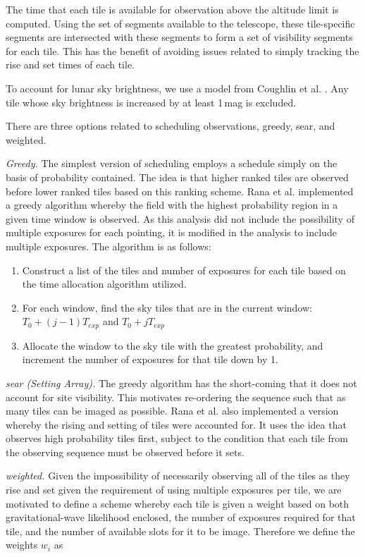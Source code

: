 \documentclass[twocolumn]{aastex61}
\begin{document}
The time that each tile is available for observation above the altitude limit is computed.
Using the set of segments available to the telescope, these tile-specific segments  are intersected with these segments to form a set of visibility segments for each tile.
This has the benefit of avoiding issues related to simply tracking the rise and set times of each tile.

To account for lunar sky brightness, we use a model from Coughlin et al. \cite{CoSt2016b}. 
Any tile whose sky brightness is increased by at least 1\,mag is excluded.

There are three options related to scheduling observations, greedy, sear, and weighted.

\emph{Greedy.} The simplest version of scheduling employs a schedule simply on the basis of probability contained. The idea is that higher ranked tiles are observed before lower ranked tiles based on this ranking scheme. Rana et al. \cite{RaSi2017} implemented a greedy algorithm whereby the field with the highest probability region in a given time window is observed. As this analysis did not include the possibility of multiple exposures for each pointing, it is modified in the analysis to include multiple exposures. The algorithm is as follows:

\begin{enumerate}
\item Construct a list of the tiles and number of exposures for each tile based on the time allocation algorithm utilized.
\item For each window, find the sky tiles that are in the current window: $T_0 + (j-1) T_{exp}$ and $T_0 + j T_{exp}$
\item Allocate the window to the sky tile with the greatest probability, and increment the number of exposures for that tile down by 1.
\end{enumerate}

\emph{sear (Setting Array).} The greedy algorithm has the short-coming that it does not account for site visibility. This motivates re-ordering the sequence such that as many tiles can be imaged as possible.
Rana et al. \cite{RaSi2017} also implemented a version whereby the rising and setting of tiles were accounted for. It uses the idea that observes high probability tiles first, subject to the condition that each tile from the
observing sequence must be observed before it sets.

\emph{weighted.} Given the impossibility of necessarily observing all of the tiles as they rise and set given the requirement of using multiple exposures per tile, we are motivated to define a scheme whereby each tile is given a weight based on both gravitational-wave likelihood enclosed, the number of exposures required for that tile, and the number of available slots for it to be image. Therefore we define the weights $w_i$ as
\end{document}
